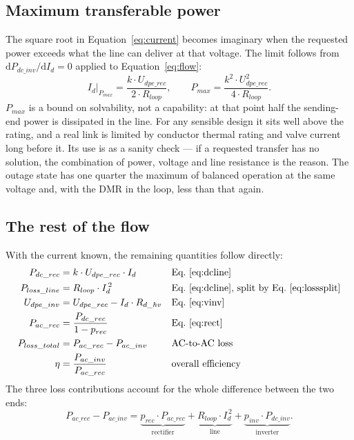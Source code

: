 \subsection{Maximum transferable power}
The square root in Equation~\eqref{eq:current} becomes imaginary when the
requested power exceeds what the line can deliver at that voltage. The limit
follows from $\mathrm{d}P_{dc\_inv}/\mathrm{d}I_{d} = 0$ applied to
Equation~\eqref{eq:flow}:
\begin{equation}
  I_{d}\big|_{P_{max}} = \frac{k\cdot U_{dpe\_rec}}{2\cdot R_{loop}},
  \qquad
  P_{max} = \frac{k^{2}\cdot U_{dpe\_rec}^{2}}{4\cdot R_{loop}} .
  \label{eq:pmax}
\end{equation}
$P_{max}$ is a bound on solvability, not a capability: at that point half the
sending-end power is dissipated in the line. For any sensible design it sits
well above the rating, and a real link is limited by conductor thermal rating
and valve current long before it. Its use is as a sanity check --- if a
requested transfer has no solution, the combination of power, voltage and line
resistance is the reason. The outage state has one quarter the maximum of
balanced operation at the same voltage and, with the DMR in the loop, less than
that again.

\subsection{The rest of the flow}
With the current known, the remaining quantities follow directly:
\begin{align}
  P_{dc\_rec}      &= k\cdot U_{dpe\_rec}\cdot I_{d}                         &&\text{Eq.~\eqref{eq:dcline}} \label{eq:c1}\\
  P_{loss\_line}   &= R_{loop}\cdot I_{d}^{\,2}                   &&\text{Eq.~\eqref{eq:dcline}, split by Eq.~\eqref{eq:losssplit}} \label{eq:c2}\\
  U_{dpe\_inv}       &= U_{dpe\_rec} - I_{d}\cdot R_{d\_hv}                     &&\text{Eq.~\eqref{eq:vinv}} \label{eq:c3}\\
  P_{ac\_rec}      &= \frac{P_{dc\_rec}}{1-p_{rec}}            &&\text{Eq.~\eqref{eq:rect}} \label{eq:c4}\\
  P_{loss\_total}  &= P_{ac\_rec} - P_{ac\_inv}                 &&\text{AC-to-AC loss} \label{eq:c5}\\
  \eta            &= \frac{P_{ac\_inv}}{P_{ac\_rec}}           &&\text{overall efficiency} \label{eq:c6}
\end{align}
The three loss contributions account for the whole difference between the two
ends:
\begin{equation}
  P_{ac\_rec} - P_{ac\_inv}
  = \underbrace{p_{rec}\cdot P_{ac\_rec}}_{\text{rectifier}}
  + \underbrace{R_{loop}\cdot I_{d}^{\,2}}_{\text{line}}
  + \underbrace{p_{inv}\cdot P_{dc\_inv}}_{\text{inverter}} .
  \label{eq:closure}
\end{equation}
